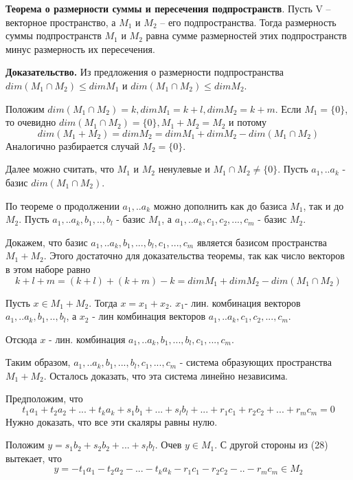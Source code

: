 \documentclass[a4paper]{article}
\begin{document}
{\begin{small}
\textbf{Теорема о размерности суммы и пересечения подпространств}. Пусть V – векторное пространство, а $M_1$ и $M_2$ – его подпространства.
Тогда размерность суммы подпространств $M_1$ и $M_2$ равна сумме размерностей этих подпространств минус размерность их пересечения. 

\textbf{Доказательство.} Из предложения о размерности подпространства $dim(M_1 \cap M_2) \leq dim M_1$ и $dim(M_1 \cap M_2) \leq dim M_2$.

Положим $dim(M_1 \cap M_2) = k, dim M_1 = k + l, dim M_2 = k + m$. Если $M_1 = \{ 0 \}$, то очевидно $dim(M_1 \cap M_2) = \{ 0 \}, M_1 + M_2  = M_2$ и потому 
\begin{equation}
dim(M_1 + M_2) = dim M_2 = dim M_1 + dim M_2 - dim(M_1 \cap M_2)
\end{equation}
Аналогично разбирается случай $M_2 = \{ 0 \} $. 

Далее можно считать, что $M_1$ и $M_2$ ненулевые и $M_1 \cap M_2 \neq \{ 0 \}$. Пусть $a_1, .. a_k$ - базис $dim(M_1 \cap M_2)$.

По теореме о продолжении $a_1, .. a_k$ можно дополнить как до базиса $M_1$, так и до $M_2$. Пусть $a_1, .. a_k, b_1, .., b_l$ - базис $M_1$, а $a_1, .. a_k,c_1, c_2, ..., c_m$ - базис $M_2$.

Докажем, что базис $a_1, .. a_k, b_1, ..., b_l, c_1, ..., c_m$ является базисом пространства $M_1 + M_2$. Этого достаточно для доказательства теоремы, так как число векторов в этом наборе равно \begin{equation}
k + l + m = (k+l) + (k+m) - k = dim M_1 + dim M_2 -dim (M_1 \cap M_2)
\end{equation}

Пусть $x \in M_1 + M_2$. Тогда $x = x_1 + x_2$. $x_1 $- лин. комбинация векторов $a_1, .. a_k, b_1, .., b_l$, а $x_2$ - лин комбинация векторов $a_1, .. a_k,c_1, c_2, ..., c_m$.

Отсюда $x$ - лин. комбинация $a_1, .. a_k, b_1, ..., b_l, c_1, ..., c_m$. 

Таким образом, $a_1, .. a_k, b_1, ..., b_l, c_1, ..., c_m$ - система образующих пространства $M_1 + M_2$. Осталось доказать, что эта система линейно независима.

Предположим, что
 \begin{equation}
t_1a_1 + t_2a_2 + ... +t_ka_k + s_1b_1 + ... + s_lb_l + ... + r_1c_1 + r_2c_2 + ... + r_mc_m = 0
\end{equation} 
Нужно доказать, что все эти скаляры равны нулю.

Положим $y = s_1b_2 +s_2b_2 + ... + s_lb_l$. Очев $y \in M_1$. С другой стороны из (28) вытекает, что \begin{equation}
y = -t_1a_1 - t_2a_2 -... -t_ka_k - r_1c_1 -r_2c_2 -.. -r_mc_m \in M_2
\end{equation}


\end{small}}
\end{document}

